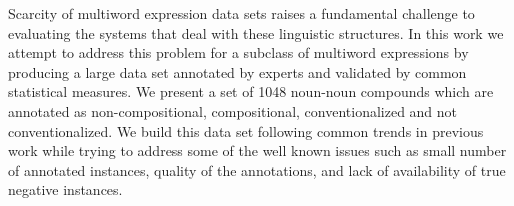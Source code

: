 Scarcity of multiword expression data sets raises a fundamental challenge to evaluating the systems that deal with these linguistic structures. In this work we attempt to address this problem for a subclass of multiword expressions by producing a large data set annotated by experts and validated by common statistical measures. We present a set of 1048 noun-noun compounds which are annotated as non-compositional, compositional, conventionalized and not conventionalized. We build this data set following common trends in previous work while trying to address some of the well known issues such as small number of annotated instances, quality of the annotations, and lack of availability of true negative instances.
